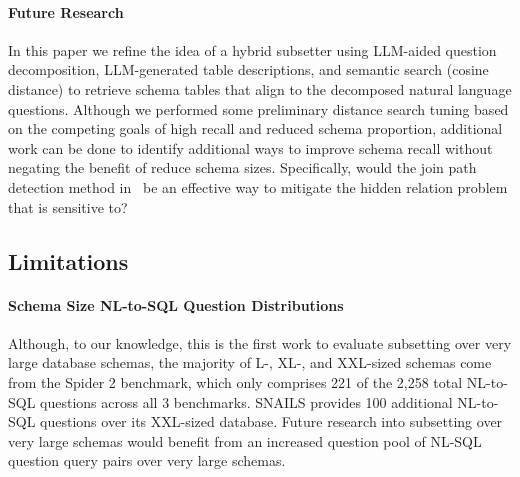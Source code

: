 \paragraph{\textbf{Future Research}}
In this paper we refine the idea of a hybrid subsetter using LLM-aided question decomposition, LLM-generated table descriptions, and semantic search (cosine distance) to retrieve schema tables that align to the decomposed natural language questions.
Although we performed some preliminary distance search tuning based on the competing goals of high recall and reduced schema proportion, additional work can be done to identify additional ways to improve schema recall without negating the benefit of reduce schema sizes. 
Specifically, would the join path detection method in~\cite{Katsogiannis-Meimarakis2026} be an effective way to mitigate the hidden relation problem that \PROJECTNAME{ }is sensitive to?

\subsection{Limitations}

\paragraph{\textbf{Schema Size NL-to-SQL Question Distributions}}
Although, to our knowledge, this is the first work to evaluate subsetting over very large database schemas, the majority of L-, XL-, and XXL-sized schemas come from the Spider 2 benchmark, which only comprises 221 of the 2,258 total NL-to-SQL questions across all 3 benchmarks.
SNAILS provides 100 additional NL-to-SQL questions over its XXL-sized database.
Future research into subsetting over very large schemas would benefit from an increased question pool of NL-SQL question query pairs over very large schemas.



